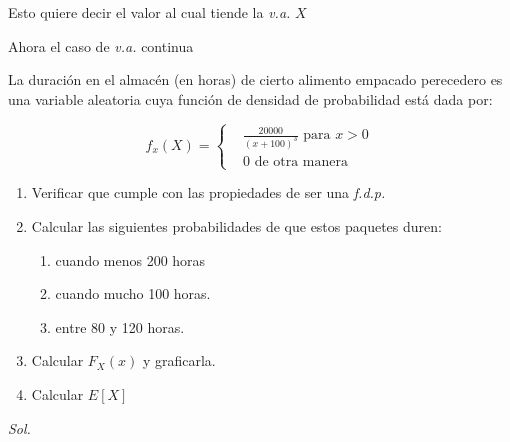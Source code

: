 Esto quiere decir el valor al cual tiende la \textit{v.a.} $X$

\begin{example}
    Ahora el caso de \textit{v.a.} continua

    La duración en el almacén (en horas) de cierto alimento empacado perecedero es
    una variable aleatoria cuya función de densidad de probabilidad está dada por:

    \begin{equation*}
        f_x(X)=\begin{cases}
             & \frac{20000}{\left(x+100 \right)^3}\text{ para } x>0 \\
             & 0\text{ de otra manera}
        \end{cases}
    \end{equation*}

    \begin{enumerate}
        \item Verificar que cumple con las propiedades de ser una \textit{f.d.p.}
        \item Calcular las siguientes probabilidades de que estos paquetes duren: \begin{enumerate}
                  \item cuando menos 200 horas
                  \item cuando mucho 100 horas.
                  \item entre 80 y 120 horas.
              \end{enumerate}
        \item Calcular $F_X(x)$ y graficarla.
        \item Calcular $E\left[ X\right]$
    \end{enumerate}
\end{example}


\textit{ Sol. }


